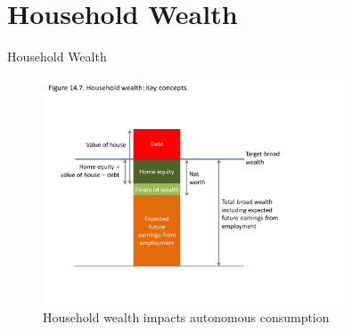 \documentclass[11pt,aspectratio=43,usenames,dvipsnames]{beamer}
\theoremstyle{definition}
\begin{document}
\section[$C$]{Household Wealth}
\label{sec:Household_Wealth}


\begin{frame}{Household Wealth}
\label{slide:Household_Wealth}
    \begin{figure}
        \centering
        \includegraphics[width=0.8\textwidth]{./figures/8.pdf}
        \caption{Household wealth impacts autonomous consumption}
    \end{figure}

\end{frame}
\end{document}
